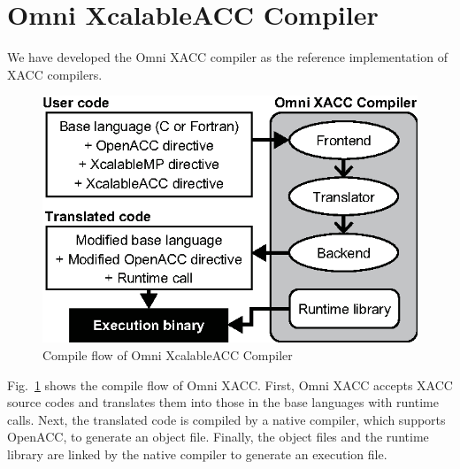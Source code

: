 \section{Omni XcalableACC Compiler}

We have developed the Omni XACC compiler as the reference implementation
of XACC compilers.

\begin{figure}[h]
\centering
\includegraphics[scale=0.94,clip]{figs/flow2.eps}
\caption{Compile flow of Omni XcalableACC Compiler}
\label{fig:flow}
\end{figure}

Fig.~\ref{fig:flow} shows the compile flow of Omni XACC.
First, 
Omni XACC accepts XACC source codes and translates them into those in
the base languages with runtime calls.
%
Next, the translated code is compiled by a native compiler, which
supports OpenACC, to generate an object file.
%
Finally, the object files and the runtime library are linked by the
native compiler to generate an execution file.



